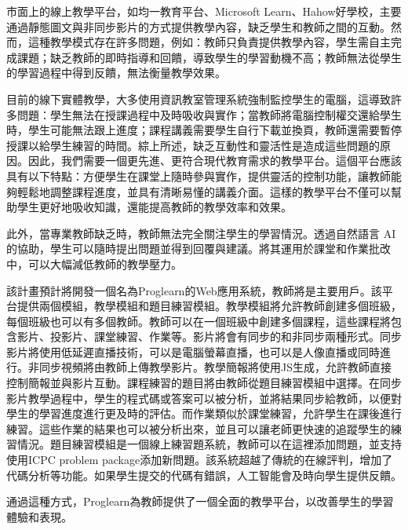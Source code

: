 \documentclass[12pt]{article}
\begin{document}
\begin{enumerate}
    \par 市面上的線上教學平台，如均一教育平台、Microsoft Learn、Hahow好學校，主要通過靜態圖文與非同步影片的方式提供教學內容，缺乏學生和教師之間的互動。然而，這種教學模式存在許多問題，例如：教師只負責提供教學內容，學生需自主完成課題；缺乏教師的即時指導和回饋，導致學生的學習動機不高；教師無法從學生的學習過程中得到反饋，無法衡量教學效果。
    \par 目前的線下實體教學，大多使用資訊教室管理系統強制監控學生的電腦，這導致許多問題：學生無法在授課過程中及時吸收與實作；當教師將電腦控制權交還給學生時，學生可能無法跟上進度；課程講義需要學生自行下載並換頁，教師還需要暫停授課以給學生練習的時間。綜上所述，缺乏互動性和靈活性是造成這些問題的原因。因此，我們需要一個更先進、更符合現代教育需求的教學平台。這個平台應該具有以下特點：方便學生在課堂上隨時參與實作，提供靈活的控制功能，讓教師能夠輕鬆地調整課程進度，並具有清晰易懂的講義介面。這樣的教學平台不僅可以幫助學生更好地吸收知識，還能提高教師的教學效率和效果。
    \par 此外，當專業教師缺乏時，教師無法完全關注學生的學習情況。透過自然語言 AI 的協助，學生可以隨時提出問題並得到回覆與建議。將其運用於課堂和作業批改中，可以大幅減低教師的教學壓力。
    \par 該計畫預計將開發一個名為Proglearn的Web應用系統，教師將是主要用戶。該平台提供兩個模組，教學模組和題目練習模組。教學模組將允許教師創建多個班級，每個班級也可以有多個教師。教師可以在一個班級中創建多個課程，這些課程將包含影片、投影片、課堂練習、作業等。影片將會有同步的和非同步兩種形式。同步影片將使用低延遲直播技術，可以是電腦螢幕直播，也可以是人像直播或同時進行。非同步視頻將由教師上傳教學影片。教學簡報將使用JS生成，允許教師直接控制簡報並與影片互動。課程練習的題目將由教師從題目練習模組中選擇。在同步影片教學過程中，學生的程式碼或答案可以被分析，並將結果同步給教師，以便對學生的學習進度進行更及時的評估。而作業類似於課堂練習，允許學生在課後進行練習。這些作業的結果也可以被分析出來，並且可以讓老師更快速的追蹤學生的練習情況。題目練習模組是一個線上練習題系統，教師可以在這裡添加問題，並支持使用ICPC problem package添加新問題。該系統超越了傳統的在線評判，增加了代碼分析等功能。如果學生提交的代碼有錯誤，人工智能會及時向學生提供反饋。
    \par 通過這種方式，Proglearn為教師提供了一個全面的教學平台，以改善學生的學習體驗和表現。


\end{enumerate}
\end{document}
